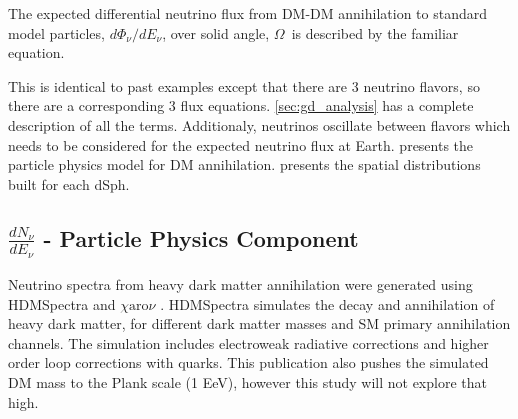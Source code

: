 The expected differential neutrino flux from DM-DM annihilation to standard model
particles, $d\Phi_{\nu}/dE_{\nu}$, over solid angle, $\Omega$~is described by the familiar equation.
\iddmannilation[\nu]

This is identical to past examples except that there are 3 neutrino flavors, so there are a corresponding 3 flux equations.
\cref{sec:gd_analysis} has a complete description of all the terms.
Additionaly, neutrinos oscillate between flavors which needs to be considered for the expected neutrino flux at Earth.
 presents the particle physics model for DM annihilation.
 presents the spatial distributions built for each dSph.

\subsection{$\frac{dN_\nu}{dE_\nu}$ - Particle Physics Component}\label{sec:icDM_particlephysics}

Neutrino spectra from heavy dark matter annihilation were generated using HDMSpectra \cite{HDMSpectra} and $\chi \textrm{aro}\nu$ \cite{Charon}.
HDMSpectra simulates the decay and annihilation of heavy dark matter, for different dark matter masses and SM primary annihilation channels.
The simulation includes electroweak radiative corrections and higher order loop corrections with quarks.
This publication also pushes the simulated DM mass to the Plank scale (1 EeV), however this study will not explore that high.

